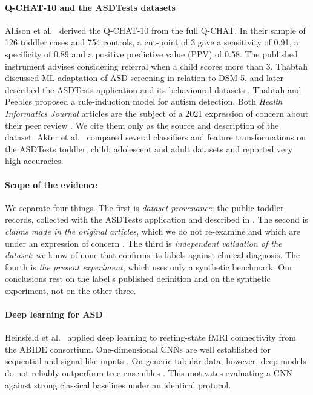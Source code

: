 \documentclass[5p,times,twocolumn]{elsarticle}
\begin{document}
\paragraph{Q-CHAT-10 and the ASDTests datasets}
Allison et al.\ \cite{allison2012} derived the Q-CHAT-10 from the full Q-CHAT. In their sample of 126 toddler cases and 754 controls, a cut-point of 3 gave a sensitivity of 0.91, a specificity of 0.89 and a positive predictive value (PPV) of 0.58. The published instrument advises considering referral when a child scores more than 3. Thabtah \cite{thabtah2017} discussed ML adaptation of ASD screening in relation to DSM-5, and later described the ASDTests application and its behavioural datasets \cite{thabtah2019}. Thabtah and Peebles \cite{thabtah2020} proposed a rule-induction model for autism detection. Both \emph{Health Informatics Journal} articles \cite{thabtah2019,thabtah2020} are the subject of a 2021 expression of concern about their peer review \cite{hijeoc2021}. We cite them only as the source and description of the dataset. Akter et al.\ \cite{akter2019} compared several classifiers and feature transformations on the ASDTests toddler, child, adolescent and adult datasets and reported very high accuracies.

\paragraph{Scope of the evidence} We separate four things. The first is \emph{dataset provenance}: the public toddler records, collected with the ASDTests application and described in \cite{thabtah2019}. The second is \emph{claims made in the original articles}, which we do not re-examine and which are under an expression of concern \cite{hijeoc2021}. The third is \emph{independent validation of the dataset}: we know of none that confirms its labels against clinical diagnosis. The fourth is \emph{the present experiment}, which uses only a synthetic benchmark. Our conclusions rest on the label's published definition and on the synthetic experiment, not on the other three.

\paragraph{Deep learning for ASD}
Heinsfeld et al.\ \cite{heinsfeld2018} applied deep learning to resting-state fMRI connectivity from the ABIDE consortium. One-dimensional CNNs are well established for sequential and signal-like inputs \cite{kiranyaz2021}. On generic tabular data, however, deep models do not reliably outperform tree ensembles \cite{grinsztajn2022}. This motivates evaluating a CNN against strong classical baselines under an identical protocol.
\end{document}
